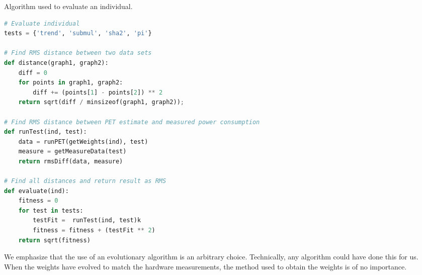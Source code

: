 \begin{algorithm}
\caption{Algorithm used to evaluate an individual.}
\label{lst:ga-eval-algorithm}
\begin{lstlisting}[language=python,style=algo]
# Evaluate individual
tests = {'trend', 'submul', 'sha2', 'pi'}

# Find RMS distance between two data sets
def distance(graph1, graph2):
    diff = 0
    for points in graph1, graph2:
        diff += (points[1] - points[2]) ** 2
    return sqrt(diff / minsizeof(graph1, graph2));

# Find RMS distance between PET estimate and measured power consumption
def runTest(ind, test):
    data = runPET(getWeights(ind), test)
    measure = getMeasureData(test)
    return rmsDiff(data, measure)

# Find all distances and return result as RMS
def evaluate(ind):
    fitness = 0
    for test in tests:
        testFit =  runTest(ind, test)k
        fitness = fitness + (testFit ** 2)
    return sqrt(fitness)
\end{lstlisting}
\end{algorithm}




We emphasize that the use of an evolutionary algorithm is an arbitrary choice.
Technically, any algorithm could have done this for us. When the weights have
evolved to match the hardware measurements, the method used to obtain the
weights is of no importance.
